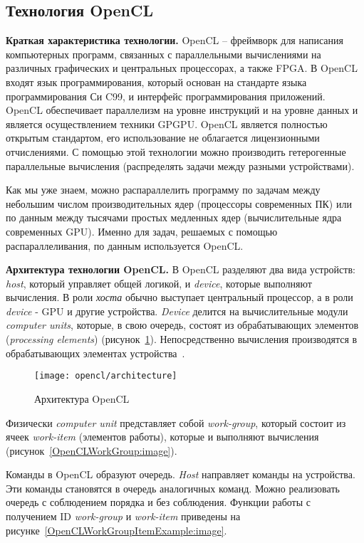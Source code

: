 \subsection{Технология OpenCL}
\label{OpenCL:section}

\textbf{Краткая характеристика технологии.} OpenCL -- фреймворк для написания компьютерных программ, связанных с параллельными вычислениями на различных графических и центральных процессорах, а также FPGA. В OpenCL входят язык программирования, который основан на стандарте языка программирования Си C99, и интерфейс программирования приложений. OpenCL обеспечивает параллелизм на уровне инструкций и на уровне данных и является осуществлением техники GPGPU. OpenCL является полностью открытым стандартом, его использование не облагается лицензионными отчислениями. С помощью этой технологии можно производить гетерогенные параллельные вычисления (распределять задачи между разными устройствами).

Как мы уже знаем, можно распараллелить программу по задачам между небольшим числом производительных ядер (процессоры современных ПК) или по данным между тысячами простых медленных ядер (вычислительные ядра современных GPU). Именно для задач, решаемых с помощью распараллеливания, по данным используется OpenCL.

\textbf{Архитектура технологии OpenCL.} В OpenCL разделяют два вида устройств: \textit{host}, который управляет общей логикой, и \textit{device}, которые выполняют вычисления. В роли \textit{хоста} обычно выступает центральный процессор, а в роли \textit{device} - GPU и другие устройства. \textit{Device} делится на вычислительные модули \textit{computer units}, которые, в свою очередь, состоят из обрабатывающих элементов (\textit{processing elements}) (рисунок~\ref{OpenCLArchitecture:image}). Непосредственно вычисления производятся в обрабатывающих элементах устройства~\cite{Bastrakov2011}.

\begin{figure}[H]
    \texttt{[image: opencl/architecture]}
    \caption{Архитектура OpenCL}
    \label{OpenCLArchitecture:image}
\end{figure}

Физически \textit{computer unit} представляет собой \textit{work-group}, который состоит из ячеек \textit{work-item} (элементов работы), которые и выполняют вычисления (рисунок~\ref{OpenCLWorkGroup:image}).

Команды в OpenCL образуют очередь. \textit{Host} направляет команды на устройства. Эти команды становятся в очередь аналогичных команд. Можно реализовать очередь с соблюдением порядка и без соблюдения.
Функции работы с получением ID \textit{work-group} и \textit{work-item} приведены на рисунке~\ref{OpenCLWorkGroupItemExample:image}.

